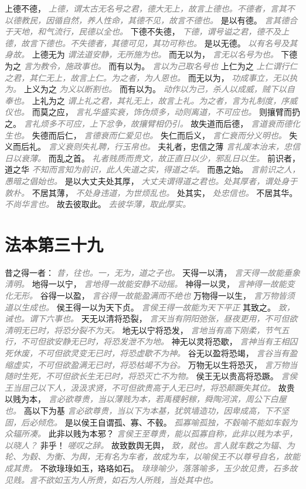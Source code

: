 \documentclass[a4paper,zihao=-4,oneside,landscape,UTF8]{ctexart}
\newcommand{\zhushi}[1]{\scriptsize{\textit{\textcolor{gray}{#1}}}\normalsize}
\begin{document}
上德不德，
\zhushi{上德，谓太古无名号之君，德大无上，故言上德也。不德者，言其不以德教民，因循自然，养人性命，其德不见，故言不德也。}
是以有德。
\zhushi{言其德合于天地，和气流行，民德以全也。}
下德不失德，
\zhushi{下德，谓号谥之君，德不及上德，故言下德也。不失德者，其德可见，其功可称也。}
是以无德。
\zhushi{以有名号及其身故。}
上德无为
\zhushi{谓法道安静，无所施为也。}
而无以为，
\zhushi{言无以名号为也。}
下德为之
\zhushi{言为教令，施政事也。}
而有以为。
\zhushi{言以为己取名号也}
上仁为之
\zhushi{上仁谓行仁之君，其仁无上，故言上仁。为之者，为人恩也。}
而无以为，
\zhushi{功成事立，无以执为。}
上义为之
\zhushi{为义以断割也。}
而有以为。
\zhushi{动作以为己，杀人以成威，贼下以自奉也。}
上礼为之
\zhushi{谓上礼之君，其礼无上，故言上礼。为之者，言为礼制度，序威仪也。}
而莫之应，
\zhushi{言礼华盛实衰，饰伪烦多，动则离道，不可应也。}
则攘臂而扔之。
\zhushi{言礼烦多不可应，上下忿争，故攘臂相仍引。}
故失道而后德，
\zhushi{言道衰而德化生也。}
失德而后仁，
\zhushi{言德衰而仁爱见也。}
失仁而后义，
\zhushi{言仁衰而分义明也。}
失义而后礼。
\zhushi{言义衰则失礼聘，行玉帛也。}
夫礼者，忠信之薄
\zhushi{言礼废本治末，忠信日以衰薄。}
而乱之首。
\zhushi{礼者贱质而贵文，故正直日以少，邪乱日以生。}
前识者，道之华
\zhushi{不知而言知为前识，此人失道之实，得道之华。}
而愚之始。
\zhushi{言前识之人，愚暗之倡始也。}
是以大丈夫处其厚，
\zhushi{大丈夫谓得道之君也。处其厚者，谓处身于敦朴。}
不居其薄，
\zhushi{不处身违道，为世烦乱也。}
处其实，
\zhushi{处忠信也。}
不居其华。
\zhushi{不尚华言也。}
故去彼取此。
\zhushi{去彼华薄，取此厚实。}


\section{法本第三十九}


昔之得一者：
\zhushi{昔，往也。一，无为，道之子也。}
天得一以清，
\zhushi{言天得一故能垂象清明。}
地得一以宁，
\zhushi{言地得一故能安静不动摇。}
神得一以灵，
\zhushi{言神得一故能变化无形。}
谷得一以盈，
\zhushi{言谷得一故能盈满而不绝也}
万物得一以生，
\zhushi{言万物皆须道以生成也。}
侯王得一以为天下贞。
\zhushi{言侯王得一故能为天下平正}
其致之。
\zhushi{致，诫也。谓下六事也。}
天无以清将恐裂，
\zhushi{言天当有阴阳弛张，昼夜更用，不可但欲清明无已时，将恐分裂不为天。}
地无以宁将恐发，
\zhushi{言地当有高下刚柔，节气五行，不可但欲安静无已时，将恐发泄不为地。}
神无以灵将恐歇，
\zhushi{言神当有王相囚死休废，不可但欲灵变无已时，将恐虚歇不为神。}
谷无以盈将恐竭，
\zhushi{言谷当有盈缩虚实，不可但欲盈满无已时，将恐枯竭不为谷。}
万物无以生将恐灭，
\zhushi{言万物当随时生死，不可但欲长生无已时，将恐灭亡不为物。}
侯王无以贵高将恐蹶。
\zhushi{言侯王当屈己以下人，汲汲求贤，不可但欲贵高于人无已时，将恐颠蹶失其位。}
故贵以贱为本，
\zhushi{言必欲尊贵，当以薄贱为本，若禹稷躬稼，舜陶河滨，周公下白屋也。}
高以下为基
\zhushi{言必欲尊贵，当以下为本基，犹筑墙造功，因卑成高，下不坚固，后必倾危。}
是以侯王自谓孤、寡、不毂。
\zhushi{孤寡喻孤独，不毂喻不能如车毂为众辐所凑。}
此非以贱为本邪？
\zhushi{言侯王至尊贵，能以孤寡自称，此非以贱为本乎，以晓人？}
非乎！
\zhushi{嗟叹之辞。}
故致数舆无舆，
\zhushi{致，就也。言人就车数之为辐、为轮、为毂、为衡、为舆，无有名为车者，故成为车，以喻侯王不以尊号自名，故能成其贵。}
不欲琭琭如玉，珞珞如石。
\zhushi{琭琭喻少，落落喻多，玉少故见贵，石多故见贱。言不欲如玉为人所贵，如石为人所贱，当处其中也。}
\end{document}
